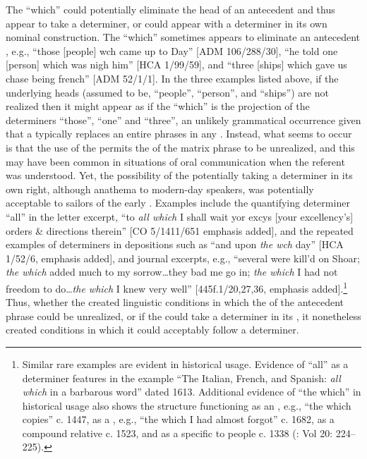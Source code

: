 The  “which” could potentially eliminate the head  of an antecedent  and thus appear to take a determiner, or could appear with a determiner in its own nominal construction. The  “which” sometimes appears to eliminate an antecedent , e.g., “those [people] wch came up to Day” [ADM 106/288/30], “he told one [person] which was nigh him” [HCA 1/99/59], and “three [ships] which gave us chase being french” [ADM 52/1/1]. In the three examples listed above, if the underlying  heads (assumed to be, “people”, “person”, and “ships”) are not realized then it might appear as if the  “which” is the  projection of the determiners “those”, “one” and “three”, an unlikely grammatical occurrence given that a  typically replaces an entire  phrases in any . Instead, what seems to occur is that the use of the  permits the  of the matrix phrase to be unrealized, and this may have been common in situations of oral communication when the referent was understood. Yet, the possibility of the  potentially taking a determiner in its own right, although anathema to modern-day speakers, was potentially acceptable to sailors of the early . Examples include the quantifying determiner “all” in the letter excerpt, “to \textit{all which} I shall wait yor excys [your excellency’s] orders \& directions therein” [CO 5/1411/651 emphasis added], and the repeated examples of  determiners in depositions such as “and upon \textit{the wch} day” [HCA 1/52/6, emphasis added], and journal excerpts, e.g., “several were kill’d on Shoar; \textit{the which} added much to my sorrow…they bad me go in; \textit{the which} I had not freedom to do…\textit{the which} I knew very well” [445f.1/20,27,36, emphasis added].\footnote{Similar rare examples are evident in historical usage. Evidence of “all” as a determiner features in the example “The Italian, French, and Spanish: \textit{all which} in a barbarous word” dated 1613. Additional evidence of “the which” in historical usage also shows the structure functioning as an , e.g., “the which copies” c. 1447, as a , e.g., “the which I had almost forgot” c. 1682, as a compound relative c. 1523, and as a  specific to people c. 1338 (\citealt{oed1989}: Vol 20: 224–225).} Thus, whether the  created linguistic conditions in which the  of the antecedent phrase could be unrealized, or if the  could take a determiner in its , it nonetheless created conditions in which it could acceptably follow a determiner. 

